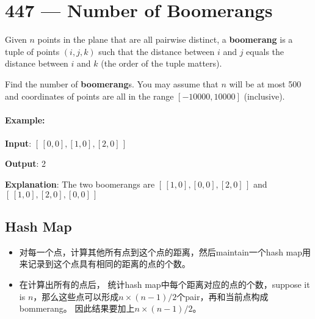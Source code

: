 \section{447 --- Number of Boomerangs}
Given $n$ points in the plane that are all pairwise distinct, a \textbf{boomerang} is a tuple of points $(i, j, k)$ such that the distance between $i$ and $j$ equals the distance between $i$ and $k$ (the order of the tuple matters).

Find the number of \textbf{boomerang}s. You may assume that $n$ will be at most 500 and coordinates of points are all in the range $[-10000, 10000]$ (inclusive).

\paragraph{Example:}

\begin{flushleft}
\textbf{Input}: $[\, [0,0],[1,0],[2,0]\,]$

\textbf{Output}: 2

\textbf{Explanation}: The two boomerangs are $[\,[1,0],[0,0],[2,0]\,]$ and $[\,[1,0],[2,0],[0,0]\,]$

\end{flushleft}

\subsection{Hash Map}
\begin{itemize}
\item 对每一个点，计算其他所有点到这个点的距离，然后maintain一个hash map用来记录到这个点具有相同的距离的点的个数。
\item 在计算出所有的点后， 统计hash map中每个距离对应的点的个数，suppose it is $n$，那么这些点可以形成$n\times (n-1)/2$个pair，再和当前点构成bommerang。
因此结果要加上$n\times (n-1)/2$。
\end{itemize}

